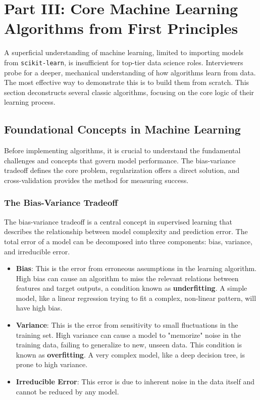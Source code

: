 \documentclass[11pt,a4paper]{article}
\begin{document}
\section{Part III: Core Machine Learning Algorithms from First Principles}

A superficial understanding of machine learning, limited to importing models from \texttt{scikit-learn}, is insufficient for top-tier data science roles. Interviewers probe for a deeper, mechanical understanding of how algorithms learn from data. The most effective way to demonstrate this is to build them from scratch. This section deconstructs several classic algorithms, focusing on the core logic of their learning process.

\subsection{Foundational Concepts in Machine Learning}

Before implementing algorithms, it is crucial to understand the fundamental challenges and concepts that govern model performance. The bias-variance tradeoff defines the core problem, regularization offers a direct solution, and cross-validation provides the method for measuring success.

\subsubsection{The Bias-Variance Tradeoff}

The bias-variance tradeoff is a central concept in supervised learning that describes the relationship between model complexity and prediction error. The total error of a model can be decomposed into three components: bias, variance, and irreducible error.
\begin{itemize}
    \item \textbf{Bias}: This is the error from erroneous assumptions in the learning algorithm. High bias can cause an algorithm to miss the relevant relations between features and target outputs, a condition known as \textbf{underfitting}. A simple model, like a linear regression trying to fit a complex, non-linear pattern, will have high bias.
    \item \textbf{Variance}: This is the error from sensitivity to small fluctuations in the training set. High variance can cause a model to "memorize" noise in the training data, failing to generalize to new, unseen data. This condition is known as \textbf{overfitting}. A very complex model, like a deep decision tree, is prone to high variance.
    \item \textbf{Irreducible Error}: This error is due to inherent noise in the data itself and cannot be reduced by any model.
\end{itemize}
\end{document}
